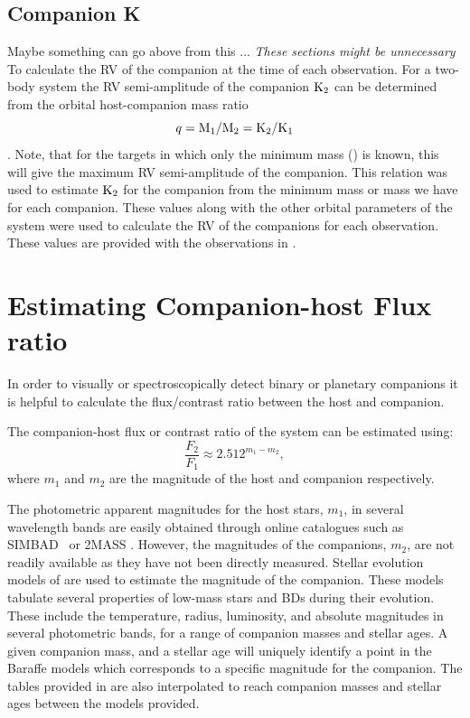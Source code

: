 \subsection{Companion K}  Maybe something can go above from this ...
\label{sec:companion_RV}
\emph{These sections might be unnecessary}\\

To calculate the {RV} of the companion at the time of each observation. For a two-body system the {RV} semi-amplitude of the companion \(\textrm{K}_{2}\) can be determined from the orbital host-companion mass ratio \[q = \textrm{M}_{1}/\textrm{M}_{2} = \textrm{K}_{2}/\textrm{K}_{1}\label{eqn:q_ratio_K2}\].
Note, that for the targets in which only the minimum mass (\mtwosini) is known, this will give the maximum {RV} semi-amplitude of the companion.
This relation was used to estimate \(\textrm{K}_{2}\) for the companion from the minimum mass or mass we have for each companion. These values along with the other orbital parameters of the system were used to calculate the {RV} of the companions for each observation. These values are provided with the observations in .




\section{Estimating Companion-host Flux ratio}
\label{sec:compaion_flux_ratio}
In order to visually or spectroscopically detect binary or planetary companions it is helpful to calculate the flux/contrast ratio between the host and companion.

The companion-host flux or contrast ratio of the system can be estimated using:
\begin{equation}
\frac{F_{2}}{F_{1}} \approx 2.512^{m_{1} - m_{2}}, \label{eqn:mag_flux_ratios}
\end{equation}
where \(m_{1}\) and \(m_{2}\) are the magnitude of the host and companion respectively.

The photometric apparent magnitudes for the host stars, \(m_{1}\), in several wavelength bands are easily obtained through online catalogues such as {SIMBAD}~\citep{wenger_simbad_2000} or {2MASS} \citep{skrutskie_two_2006}.
However, the magnitudes of the companions, \(m_{2}\), are not readily available as they have not been directly measured.
Stellar evolution models of \citet{baraffe_evolutionary_2003, baraffe_new_2015} are used to estimate the magnitude of the companion.
These models tabulate several properties of low-mass stars and BDs during their evolution.
These include the temperature, radius, luminosity, and absolute magnitudes in several photometric bands, for a range of companion masses and stellar ages.
A given companion mass, and a stellar age will uniquely identify a point in the Baraffe models which corresponds to a specific magnitude for the companion.
The tables provided in \citet{baraffe_evolutionary_2003, baraffe_new_2015} are also interpolated to reach companion masses and stellar ages between the models provided.

